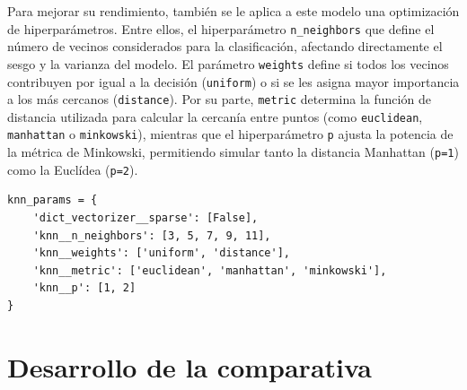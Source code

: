 \documentclass[11pt,a4paper,spanish]{book}
\numberwithin{equation}{chapter}
\numberwithin{figure}{chapter}
\begin{document}
Para mejorar su rendimiento, también se le aplica a este modelo una optimización de 
hiperparámetros. Entre ellos, el hiperparámetro \lstinline|n_neighbors| que define el 
número de vecinos considerados para la clasificación, afectando directamente el sesgo y 
la varianza del modelo. El parámetro \lstinline|weights| define si todos los vecinos 
contribuyen por igual a la decisión (\lstinline|uniform|) o si se les asigna mayor 
importancia a los más cercanos (\lstinline|distance|). Por su parte, \lstinline|metric| 
determina la función de distancia utilizada para calcular la cercanía entre puntos 
(como \lstinline|euclidean|, \lstinline|manhattan| o \lstinline|minkowski|), mientras 
que el hiperparámetro \lstinline|p| ajusta la potencia de la métrica de Minkowski, 
permitiendo simular tanto la distancia Manhattan (\lstinline|p=1|) como la 
Euclídea (\lstinline|p=2|). 


\vspace{5mm}
\begin{lstlisting}
knn_params = {
    'dict_vectorizer__sparse': [False],
    'knn__n_neighbors': [3, 5, 7, 9, 11],     
    'knn__weights': ['uniform', 'distance'],  
    'knn__metric': ['euclidean', 'manhattan', 'minkowski'],  
    'knn__p': [1, 2]  
}
\end{lstlisting}


\section{Desarrollo de la comparativa}
\end{document}
